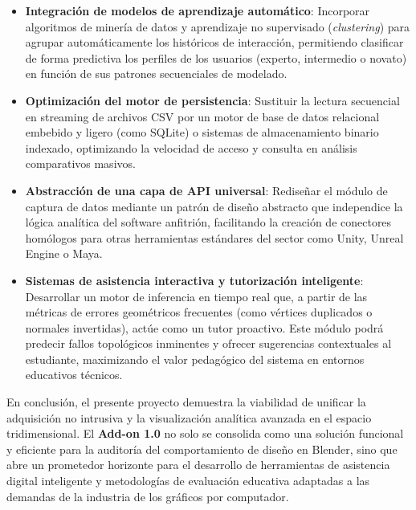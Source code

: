 \begin{itemize}
    \item \textbf{Integración de modelos de aprendizaje automático}: Incorporar algoritmos de minería de datos y aprendizaje no supervisado (\textit{clustering}) para agrupar automáticamente los históricos de interacción, permitiendo clasificar de forma predictiva los perfiles de los usuarios (experto, intermedio o novato) en función de sus patrones secuenciales de modelado.
    \item \textbf{Optimización del motor de persistencia}: Sustituir la lectura secuencial en streaming de archivos CSV por un motor de base de datos relacional embebido y ligero (como SQLite) o sistemas de almacenamiento binario indexado, optimizando la velocidad de acceso y consulta en análisis comparativos masivos.
    \item \textbf{Abstracción de una capa de API universal}: Rediseñar el módulo de captura de datos mediante un patrón de diseño abstracto que independice la lógica analítica del software anfitrión, facilitando la creación de conectores homólogos para otras herramientas estándares del sector como Unity, Unreal Engine o Maya.
    \item \textbf{Sistemas de asistencia interactiva y tutorización inteligente}: Desarrollar un motor de inferencia en tiempo real que, a partir de las métricas de errores geométricos frecuentes (como vértices duplicados o normales invertidas), actúe como un tutor proactivo. Este módulo podrá predecir fallos topológicos inminentes y ofrecer sugerencias contextuales al estudiante, maximizando el valor pedagógico del sistema en entornos educativos técnicos.
\end{itemize}

En conclusión, el presente proyecto demuestra la viabilidad de unificar la adquisición no intrusiva y la visualización analítica avanzada en el espacio tridimensional. El \textbf{Add-on 1.0} no solo se consolida como una solución funcional y eficiente para la auditoría del comportamiento de diseño en Blender, sino que abre un prometedor horizonte para el desarrollo de herramientas de asistencia digital inteligente y metodologías de evaluación educativa adaptadas a las demandas de la industria de los gráficos por computador.